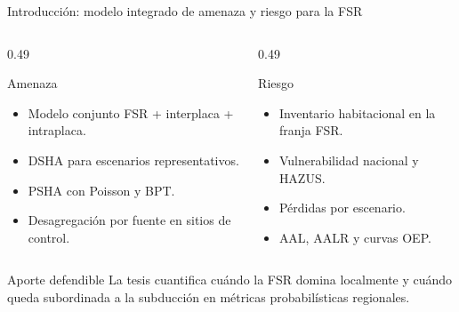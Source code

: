 \documentclass[aspectratio=169,10pt]{beamer}
\newcommand{\tightlist}{\setlength{\itemsep}{0.28em}}
\begin{document}
\begin{frame}[t]{Introducción: modelo integrado de amenaza y riesgo para la FSR}
\begin{columns}[T,onlytextwidth]
  \begin{column}{0.49\textwidth}
    \begin{block}{Amenaza}
      \begin{itemize}\tightlist
        \item Modelo conjunto FSR + interplaca + intraplaca.
        \item DSHA para escenarios representativos.
        \item PSHA con Poisson y BPT.
        \item Desagregación por fuente en sitios de control.
      \end{itemize}
    \end{block}
  \end{column}
  \begin{column}{0.49\textwidth}
    \begin{block}{Riesgo}
      \begin{itemize}\tightlist
        \item Inventario habitacional en la franja FSR.
        \item Vulnerabilidad nacional y HAZUS.
        \item Pérdidas por escenario.
        \item AAL, AALR y curvas OEP.
      \end{itemize}
    \end{block}
  \end{column}
\end{columns}
\vspace{0.45em}
\begin{block}{Aporte defendible}
La tesis cuantifica cuándo la FSR domina localmente y cuándo queda subordinada a la subducción en métricas probabilísticas regionales.
\end{block}
\end{frame}
\end{document}
